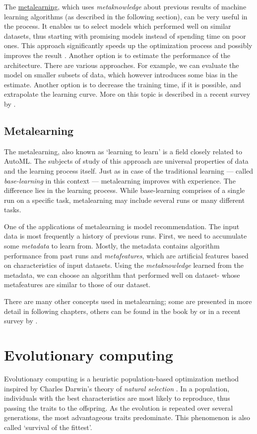 The \hyperref[metalearning]{metalearning}, which uses \emph{metaknowledge}
about previous results of machine learning algorithms (as described in the
following section), can be very useful in the process. It enables us to
select models which performed well on similar datasets, thus starting with
promising models instead of spending time on poor ones. This approach
significantly speeds up the optimization process and possibly improves the
result \citep{DBLP:journals/corr/abs-1810-03548}.
Another option is to estimate the performance of the architecture. There are
various approaches. For example, we can evaluate the model on smaller subsets of
data, which however introduces some bias in the estimate. Another option is to
decrease the training time, if it is possible, and extrapolate the learning
curve. More on this topic is described in a recent survey by
\cite{2018arXiv180805377E}.

\subsection{Metalearning} \label{metalearning}
The metalearning, also known as `learning to learn' is a field closely related
to AutoML. The subjects of study of this approach are universal properties of 
data and the learning process itself. Just as in case of the traditional
learning --- called \emph{base-learning} in this context --- metalearning
improves with experience. The difference lies in the learning process. While
base-learning comprises of a single run on a specific task, metalearning may
include several runs or many different tasks. 

One of the applications of metalearning is model recommendation. The input
data is most frequently a history of previous runs. First, we need to
accumulate some \emph{metadata} to learn from. Mostly, the metadata contains
algorithm performance from past runs and \emph{metafeatures}, which are
artificial features based on characteristics of input datasets. Using the
\emph{metaknowledge} learned from the metadata, we can choose an algorithm that
performed well on dataset- whose metafeatures are similar to those of our
dataset.

There are many other concepts used in metalearning; some are presented in more
detail in following chapters, others can be found in the book by
\cite{Brazdil:2008:MAD:1507541} or in a recent survey by
\cite{DBLP:journals/corr/abs-1810-03548}.

\section{Evolutionary computing} \label{ea}
Evolutionary computing is a heuristic population-based optimization method
inspired by  Charles Darwin's theory of \emph{natural selection} \cite{darwin}.
In a population, individuals with the best characteristics are most likely
to reproduce, thus passing the traits to the offspring. As the 
evolution is repeated over several generations, the most advantageous traits 
predominate. This phenomenon is also called `survival of the fittest'.

